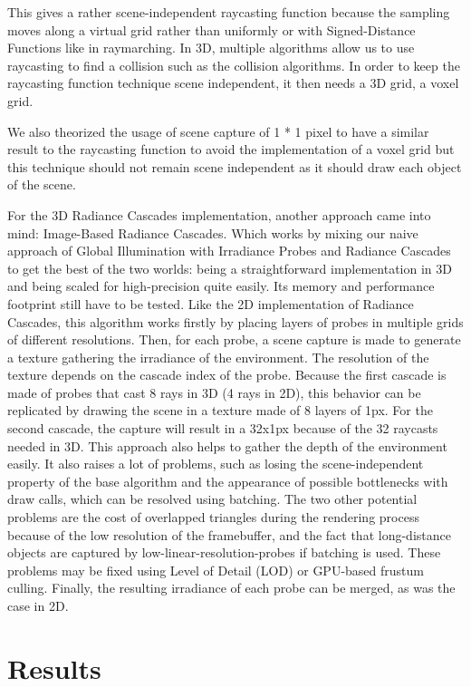 \documentclass{rapportCS}
\begin{document}
This gives a rather scene-independent raycasting function because the sampling moves along a virtual grid rather than uniformly or with Signed-Distance Functions like in raymarching.
In 3D, multiple algorithms allow us to use raycasting to find a collision such as the collision algorithms. In order to keep the raycasting function technique scene independent, it then needs a 3D grid, a voxel grid.

We also theorized the usage of scene capture of 1 * 1 pixel to have a similar result to the raycasting function to avoid the implementation of a voxel grid but this technique should not remain scene independent as it should draw each object of the scene.

For the 3D Radiance Cascades implementation, another approach came into mind: Image-Based Radiance Cascades. Which works by mixing our naive approach of Global Illumination with Irradiance Probes and Radiance Cascades to get the best of the two worlds: being a straightforward implementation in 3D and being scaled for high-precision quite easily. Its memory and performance footprint still have to be tested. 
Like the 2D implementation of Radiance Cascades, this algorithm works firstly by placing layers of probes in multiple grids of different resolutions. Then, for each probe, a scene capture is made to generate a texture gathering the irradiance of the environment. The resolution of the texture depends on the cascade index of the probe. Because the first cascade is made of probes that cast 8 rays in 3D (4 rays in 2D), this behavior can be replicated by drawing the scene in a texture made of 8 layers of 1px. For the second cascade, the capture will result in a 32x1px because of the 32 raycasts needed in 3D.
This approach also helps to gather the depth of the environment easily. It also raises a lot of problems, such as losing the scene-independent property of the base algorithm and the appearance of possible bottlenecks with draw calls, which can be resolved using batching. The two other potential problems are the cost of overlapped triangles during the rendering process because of the low resolution of the framebuffer, and the fact that long-distance objects are captured by low-linear-resolution-probes if batching is used. These problems may be fixed using Level of Detail (LOD) or GPU-based frustum culling.
Finally, the resulting irradiance of each probe can be merged, as was the case in 2D.




\section{Results}
\end{document}
